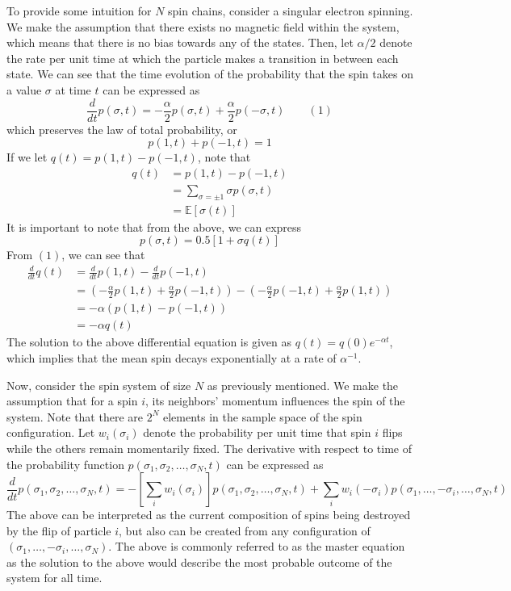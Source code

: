 \documentclass[12pt]{article}
\newcommand{\E}{\mathbb{E}}
\theoremstyle{definition}
\theoremstyle{remark}
\begin{document}
To provide some intuition for $N$ spin chains, consider a singular electron spinning. We make the assumption that there exists no magnetic field within the system, which means that there is no bias towards any of the states. Then, let $\alpha /2 $ denote the rate per unit time at which the particle makes a transition in between each state. We can see that the time evolution of the probability that the spin takes on a value $\sigma$ at time $t$ can be expressed as
\[
\frac{d}{dt} p(\sigma,t) = -\frac{\alpha}{2}p(\sigma, t) + \frac{\alpha}{2}p(-\sigma, t) \qquad (1)
\]
which preserves the law of total probability, or
\[
p(1,t) + p(-1,t) = 1
\]
If we let $q(t) = p(1,t) - p(-1,t)$, note that 
\begin{align*}
    q(t) &= p(1,t) - p(-1,t)\\
    &= \sum_{\sigma = \pm 1}\sigma p(\sigma,t) \\
    &= \E[\sigma(t)]
\end{align*}
It is important to note that from the above, we can express 
\[
p(\sigma, t) = 0.5[1 + \sigma q(t)]
\]
From $(1)$, we can see that 
\begin{align*}
\frac{d}{dt} q(t) &= \frac{d}{dt} p(1,t) - \frac{d}{dt}p(-1,t) \\
&= \left(-\frac{\alpha}{2}p(1, t) + \frac{\alpha}{2}p(-1, t)\right)  - \left(-\frac{\alpha}{2}p(-1, t) + \frac{\alpha}{2}p(1, t)\right)\\
&= -\alpha (p(1,t) - p(-1,t))\\
&= -\alpha q(t)
\end{align*}
The solution to the above differential equation is given as $q(t) = q(0)e^{-\alpha t}$, which implies that the mean spin decays exponentially at a rate of $\alpha^{-1}$. 

Now, consider the spin system of size $N$ as previously mentioned. We make the assumption that for a spin $i$, its neighbors' momentum influences the spin of the system. Note that there are $2^N$ elements in the sample space of the spin configuration. Let $w_i(\sigma_i)$ denote the probability per unit time that spin $i$ flips while the others remain momentarily fixed. The derivative with respect to time of the probability function $p(\sigma_1, \sigma_2, \dots, \sigma_N, t)$ can be expressed as
\[
\frac{d}{dt} p(\sigma_1, \sigma_2, \dots, \sigma_N, t) = - \left[ \sum_i w_i(\sigma_i)\right]p(\sigma_1, \sigma_2, \dots, \sigma_N, t) + \sum_i w_i(-\sigma_i) p(\sigma_1, \dots, -\sigma_i,\dots,  \sigma_N, t) 
\]
The above can be interpreted as the current composition of spins being destroyed by the flip of particle $i$, but also can be created from any configuration of $(\sigma_1, \dots, -\sigma_i, \dots, \sigma_N)$. The above is commonly referred to as the master equation as the solution to the above would describe the most probable outcome of the system for all time. 
\end{document}
